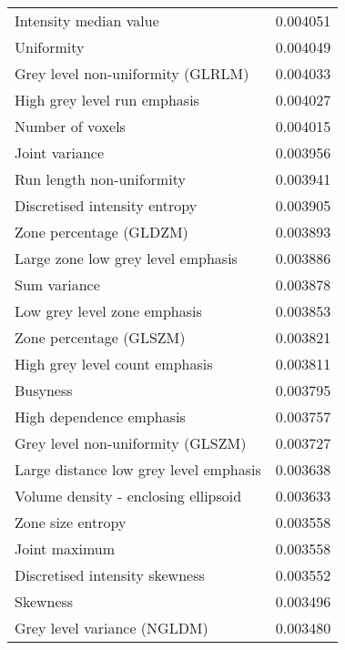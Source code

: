 \begin{longtable}{|lr|}
Intensity median value                             &        0.004051 \\
Uniformity                                         &        0.004049 \\
Grey level non-uniformity (GLRLM)                  &        0.004033 \\
High grey level run emphasis                       &        0.004027 \\
Number of voxels                                   &        0.004015 \\
Joint variance                                     &        0.003956 \\
Run length non-uniformity                          &        0.003941 \\
Discretised intensity entropy                      &        0.003905 \\
Zone percentage (GLDZM)                            &        0.003893 \\
Large zone low grey level emphasis                 &        0.003886 \\
Sum variance                                       &        0.003878 \\
Low grey level zone emphasis                       &        0.003853 \\
Zone percentage (GLSZM)                            &        0.003821 \\
High grey level count emphasis                     &        0.003811 \\
Busyness                                           &        0.003795 \\
High dependence emphasis                           &        0.003757 \\
Grey level non-uniformity (GLSZM)                  &        0.003727 \\
Large distance low grey level emphasis             &        0.003638 \\
Volume density - enclosing ellipsoid               &        0.003633 \\
Zone size entropy                                  &        0.003558 \\
Joint maximum                                      &        0.003558 \\
Discretised intensity skewness                     &        0.003552 \\
Skewness                                           &        0.003496 \\
Grey level variance (NGLDM)                        &        0.003480 \\

\end{longtable}

